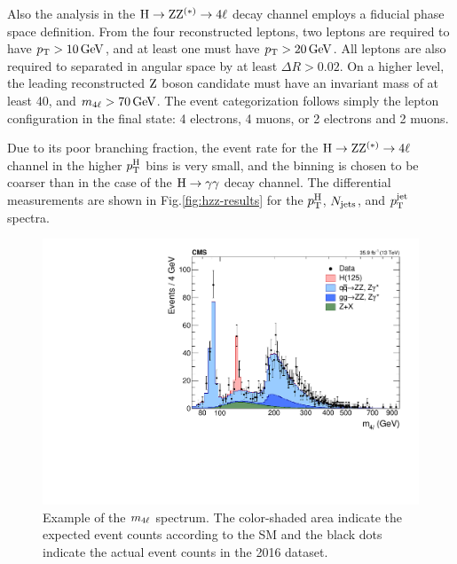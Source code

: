 Also the analysis in the $\mathrm{H}\to\mathrm{Z}\mathrm{Z}^{(\ast)}\to 4\ell$ decay channel employs a fiducial phase space definition.
% 
From the four reconstructed leptons, two leptons are required to have $p_\mathrm{T} > 10\,\text{GeV}$, and at least one must have $p_\mathrm{T} > 20\,\text{GeV}$.
% 
All leptons are also required to separated in angular space by at least $\Delta R > 0.02$.
% 
On a higher level, the leading reconstructed $\mathrm{Z}$ boson candidate must have an invariant mass of at least 40\GeV, and $m_{4\ell} > 70\,\text{GeV}$.
% 
The event categorization follows simply the lepton configuration in the final state: 4 electrons, 4 muons, or 2 electrons and 2 muons.


Due to its poor branching fraction, the event rate for the $\mathrm{H}\to\mathrm{Z}\mathrm{Z}^{(\ast)}\to 4\ell$ channel in the higher $p_\mathrm{T}^\mathrm{H}$ bins is very small, and the binning is chosen to be coarser than in the case of the $\mathrm{H}\to\mathrm{\gamma}\mathrm{\gamma}$ decay channel.
% 
The differential measurements are shown in Fig.\ref{fig:hzz-results} for the $p_\mathrm{T}^\mathrm{H}$, $N_\text{jets} $, and $p_\mathrm{T}^\text{jet} $ spectra.



\begin{figure}[hbtp]
  \begin{center}
    \includegraphics[width=0.7\linewidth]{img/inputs/hzz/m4lspectrum.pdf}
    \caption{
        Example of the $m_{4\ell}$ spectrum.
        The color-shaded area indicate the expected event counts according to the SM and the black dots indicate the actual event counts in the 2016 dataset.
        }
    \label{fig:example_mfourl}
  \end{center}
\end{figure}

